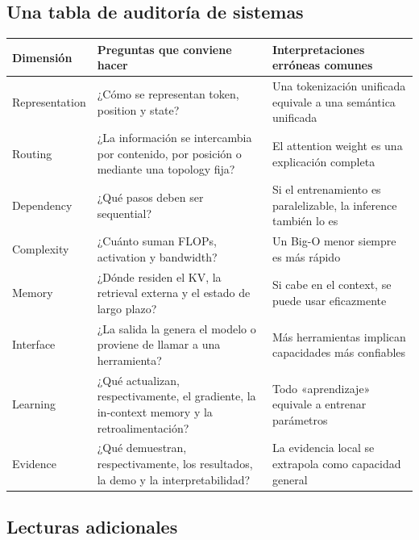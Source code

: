 \documentclass[a4paper]{article}
\begin{document}
\subsection{Una tabla de auditoría de sistemas}

\begin{longtable}{@{}L{0.18\textwidth}L{0.35\textwidth}L{0.35\textwidth}@{}}
\toprule
Dimensión & Preguntas que conviene hacer & Interpretaciones erróneas comunes \\
\midrule
Representation & ¿Cómo se representan token, position y state? & Una tokenización unificada equivale a una semántica unificada \\
Routing & ¿La información se intercambia por contenido, por posición o mediante una topology fija? & El attention weight es una explicación completa \\
Dependency & ¿Qué pasos deben ser sequential? & Si el entrenamiento es paralelizable, la inference también lo es \\
Complexity & ¿Cuánto suman FLOPs, activation y bandwidth? & Un Big-O menor siempre es más rápido \\
Memory & ¿Dónde residen el KV, la retrieval externa y el estado de largo plazo? & Si cabe en el context, se puede usar eficazmente \\
Interface & ¿La salida la genera el modelo o proviene de llamar a una herramienta? & Más herramientas implican capacidades más confiables \\
Learning & ¿Qué actualizan, respectivamente, el gradiente, la in-context memory y la retroalimentación? & Todo «aprendizaje» equivale a entrenar parámetros \\
Evidence & ¿Qué demuestran, respectivamente, los resultados, la demo y la interpretabilidad? & La evidencia local se extrapola como capacidad general \\
\bottomrule
\end{longtable}

\subsection{Lecturas adicionales}
\end{document}
